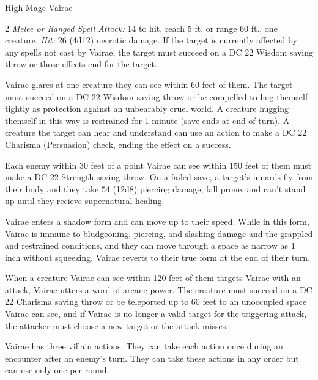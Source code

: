 \documentclass[10pt,a4paper,twoside,bg=print,twocolumn,openany,nodeprecatedcode]{dndbook}
\begin{document}
\begin{DndMonster}[float*=b,width=\textwidth + 8pt]{High Mage Vairae}
\begin{multicols}{2}
\textsl{Melee or Ranged Spell Attack:} 14 to hit, reach 5 ft. or range 60 ft., one creature. \textsl{Hit:} 26 (4d12) necrotic damage. If the target is currently affected by any spells not cast by Vairae, the target must succeed on a DC 22 Wisdom saving throw or those effects end for the target.

Vairae glares at one creature they can see within 60 feet of them. The target must succeed on a DC 22 Wisdom saving throw or be compelled to hug themself tightly as protection against an unbearably cruel world. A creature hugging themself in this way is restrained for 1 minute (save ends at end of turn). A creature the target can hear and understand can use an action to make a DC 22 Charisma (Persuasion) check, ending the effect on a success.

Each enemy within 30 feet of a point Vairae can see within 150 feet of them must make a DC 22 Strength saving throw. On a failed save, a target's innards fly from their body and they take 54 (12d8) piercing damage, fall prone, and can't stand up until they recieve supernatural healing.

Vairae enters a shadow form and can move up to their speed. While in this form, Vairae is immune to bludgeoning, piercing, and slashing damage and the grappled and restrained conditions, and they can move through a space as narrow as 1 inch without squeezing. Vairae reverts to their true form at the end of their turn.

When a creature Vairae can see within 120 feet of them targets Vairae with an attack, Vairae utters a word of arcane power. The creature must succeed on a DC 22 Charisma saving throw or be teleported up to 60 feet to an unoccupied space Vairae can see, and if Vairae is no longer a valid target for the triggering attack, the attacker must choose a new target or the attack misses.

Vairae has three villain actions. They can take each action once during an encounter after an enemy's turn. They can take these actions in any order but can use only one per round.


\end{multicols}
\end{DndMonster}
\end{document}
